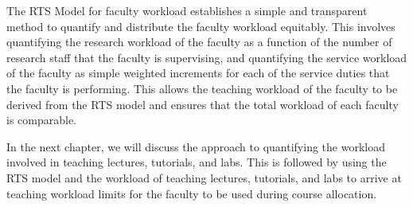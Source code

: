 The RTS Model for faculty workload establishes a simple and transparent method to quantify and distribute the faculty workload equitably. This involves quantifying the research workload of the faculty as a function of the number of research staff that the faculty is supervising, and quantifying the service workload of the faculty as simple weighted increments for each of the service duties that the faculty is performing. This allows the teaching workload of the faculty to be derived from the RTS model and ensures that the total workload of each faculty is comparable.

In the next chapter, we will discuss the approach to quantifying the workload involved in teaching lectures, tutorials, and labs. This is followed by using the RTS model and the workload of teaching lectures, tutorials, and labs to arrive at teaching workload limits for the faculty to be used during course allocation.
